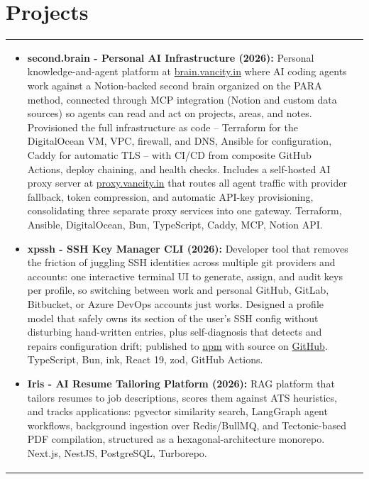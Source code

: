 \documentclass[a4paper,8pt]{article}
\begin{document}
\section{Projects}
\begin{tabularx}{\linewidth}{ @{}l r@{} }
\begin{minipage}[t]{\linewidth}
    \begin{itemize}[nosep,after=\strut, leftmargin=2em, itemsep=2pt]
        \item \textbf{second.brain - Personal AI Infrastructure (2026):} Personal knowledge-and-agent platform at \href{https://brain.vancity.in}{brain.vancity.in} where AI coding agents work against a Notion-backed second brain organized on the PARA method, connected through MCP integration (Notion and custom data sources) so agents can read and act on projects, areas, and notes. Provisioned the full infrastructure as code -- Terraform for the DigitalOcean VM, VPC, firewall, and DNS, Ansible for configuration, Caddy for automatic TLS -- with CI/CD from composite GitHub Actions, deploy chaining, and health checks. Includes a self-hosted AI proxy server at \href{https://proxy.vancity.in}{proxy.vancity.in} that routes all agent traffic with provider fallback, token compression, and automatic API-key provisioning, consolidating three separate proxy services into one gateway. Terraform, Ansible, DigitalOcean, Bun, TypeScript, Caddy, MCP, Notion API.
        \item \textbf{xpssh - SSH Key Manager CLI (2026):} Developer tool that removes the friction of juggling SSH identities across multiple git providers and accounts: one interactive terminal UI to generate, assign, and audit keys per profile, so switching between work and personal GitHub, GitLab, Bitbucket, or Azure DevOps accounts just works. Designed a profile model that safely owns its section of the user's SSH config without disturbing hand-written entries, plus self-diagnosis that detects and repairs configuration drift; published to \href{https://www.npmjs.com/package/xpssh-cli}{npm} with source on \href{https://github.com/vancityAyush/xpssh}{GitHub}. TypeScript, Bun, ink, React 19, zod, GitHub Actions.
        \item \textbf{Iris - AI Resume Tailoring Platform (2026):} RAG platform that tailors resumes to job descriptions, scores them against ATS heuristics, and tracks applications: pgvector similarity search, LangGraph agent workflows, background ingestion over Redis/BullMQ, and Tectonic-based PDF compilation, structured as a hexagonal-architecture monorepo. Next.js, NestJS, PostgreSQL, Turborepo.

\end{itemize}
\end{minipage}
\end{tabularx}
\end{document}

